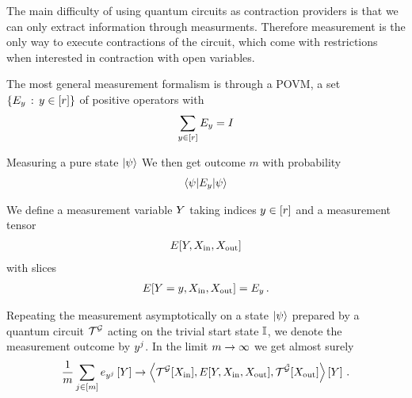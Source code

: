 \documentclass[aps,onecolumn,nofootinbib,pra]{article}
\begin{document}
    The main difficulty of using quantum circuits as contraction providers is that we can only extract information through measurments.
    Therefore measurement is the only way to execute contractions of the circuit, which come with restrictions when interested in contraction with open variables.

    The most general measurement formalism is through a POVM, a set $\{E_y \, : \, y\in[r]\}$ of positive operators with %
    \begin{align*}
        \sum_{y\in[r]} E_y = I
    \end{align*}

    Measuring a pure state $\ket{\psi}$ We then get outcome $m$ with probability
    \begin{align*}
        \braket{\psi|E_y|\psi}
    \end{align*}

    We define a measurement variable $Y$ taking indices $y\in[r]$ and a measurement tensor
    \begin{align*}
        E[Y,X_{\mathrm{in}},X_{\mathrm{out}}]
    \end{align*}
    with slices
    \begin{align*}
        E[Y=y,X_{\mathrm{in}},X_{\mathrm{out}}] = E_y \, .
    \end{align*}

    Repeating the measurement asymptotically on a state $\ket{\psi}$ prepared by a quantum circuit $\mathcal{T}^{\mathcal{G}}$ acting on the trivial start state $\mathbb{I}$, we denote the measurement outcome by $y^j$.
    In the limit $m\rightarrow\infty$ we get almost surely
    \begin{align*}
        \frac{1}{m} \sum_{j\in[m]} e_{y^j}\left[Y\right] \rightarrow
        \left\langle \mathcal{T}^{\mathcal{G}}[X_{\mathrm{in}}],E[Y,X_{\mathrm{in}},X_{\mathrm{out}}],\mathcal{T}^{\tilde{\mathcal{G}}}[X_{\mathrm{out}}]\right\rangle \left[ Y \right] \, .
    \end{align*}
\end{document}
